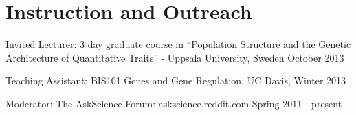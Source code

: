 \documentclass[letterpaper]{article}
\renewenvironment{itemize}{
  \begin{list}{}{
    \setlength{\leftmargin}{1.5em}
  }
}{
  \end{list}
}
\begin{document}
\section*{Instruction and Outreach}
\begin{itemize}

\item Invited Lecturer: 3 day graduate course in ``Population Structure and the Genetic Architecture of Quantitative Traits'' - Uppsala University, Sweden October 2013
\item Teaching Assistant: BIS101 Genes and Gene Regulation, UC Davis, Winter 2013
 \item Moderator: The AskScience Forum: askscience.reddit.com Spring 2011 - present


\end{itemize}
\end{document}
